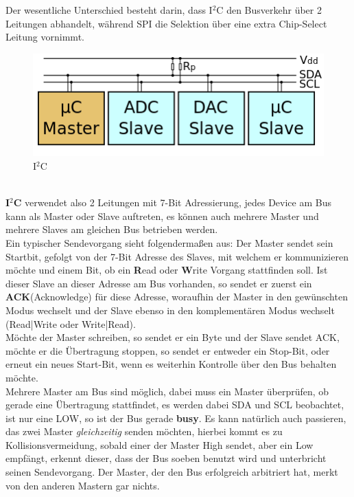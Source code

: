 \documentclass[12pt,a4paper,ngerman]{article}
\begin{document}
Der wesentliche Unterschied besteht darin, dass I$^2$C den Busverkehr über 2 Leitungen abhandelt, während SPI die Selektion über eine extra Chip-Select Leitung vornimmt. \\
\begin{figure}
\begin{center}
\includegraphics[scale=0.5]{figures/i2c.png} 
\caption{I$^2$C}
\end{center}
\vspace{-20pt}
\end{figure}\\
\textbf{I$^2$C} verwendet also 2 Leitungen mit 7-Bit Adressierung, jedes Device am Bus kann als Master oder Slave auftreten, es können auch mehrere Master und mehrere Slaves am gleichen Bus betrieben werden. \\
Ein typischer Sendevorgang sieht folgendermaßen aus: Der Master sendet sein Startbit, gefolgt von der 7-Bit Adresse des Slaves, mit welchem er kommunizieren möchte und einem Bit, ob ein \textbf{R}ead oder \textbf{W}rite Vorgang stattfinden soll. Ist dieser Slave an dieser Adresse am Bus vorhanden, so sendet er zuerst ein \textbf{ACK}(Acknowledge) für diese Adresse, woraufhin der Master in den gewünschten Modus wechselt und der Slave ebenso in den komplementären Modus wechselt (Read|Write oder Write|Read). \\
Möchte der Master schreiben, so sendet er ein Byte und der Slave sendet ACK, möchte er die Übertragung stoppen, so sendet er entweder ein Stop-Bit, oder erneut ein neues Start-Bit, wenn es weiterhin Kontrolle über den Bus behalten möchte. \\
Mehrere Master am Bus sind möglich, dabei muss ein Master überprüfen, ob gerade eine Übertragung stattfindet, es werden dabei SDA und SCL beobachtet, ist nur eine LOW, so ist der Bus gerade \textbf{busy}. Es kann natürlich auch passieren, das zwei Master \textit{gleichzeitig} senden möchten, hierbei kommt es zu Kollisionsvermeidung, sobald einer der Master High sendet, aber ein Low empfängt, erkennt dieser, dass der Bus soeben benutzt wird und unterbricht seinen Sendevorgang. Der Master, der den Bus erfolgreich arbitriert hat, merkt von den anderen Mastern gar nichts. \\
\end{document}
